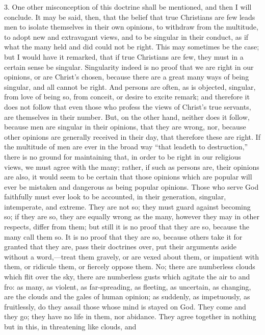 3. One other misconception of this doctrine shall be mentioned, and
then I will conclude. It may be said, then, that the belief that true
Christians are few leads men to isolate themselves in their own
opinions, to withdraw from the multitude, to adopt new and extravagant
views, and to be singular in their conduct, as if what the many held
and did could not be right. This may sometimes be the case; but I
would have it remarked, that if true Christians are few, they must in
a certain sense be singular. Singularity indeed is no proof that we
are right in our opinions, or are Christ's chosen, because there are a
great many ways of being singular, and all cannot be right. And
persons are often, as is objected, singular, from love of being so,
from conceit, or desire to excite remark; and therefore it does not
follow that even those who profess the views of Christ's true
servants, are themselves in their number. But, on the other hand,
neither does it follow, because men are singular in their opinions,
that they are wrong, nor, because other opinions are generally
received in their day, that therefore these are right. If the
multitude of men are ever in the broad way ``that leadeth to
destruction,'' there is no ground for maintaining that, in order
to be right in our religious views, we must agree with the many;
rather, if such as persons are, their opinions are also, it would seem
to be certain that those opinions which are popular will ever be
mistaken and dangerous as being popular opinions. Those who serve God
faithfully must ever look to be accounted, in their generation,
singular, intemperate, and extreme. They are not so; they must guard
against becoming so; if they are so, they are equally wrong as the
many, however they may in other respects, differ from them; but still
it is no proof that they are so, because the many call them so. It is
no proof that they are so, because others take it for granted that
they are, pass their doctrines over, put their arguments aside without
a word,—treat them gravely, or are vexed about them, or impatient
with them, or ridicule them, or fiercely oppose them. No; there are
numberless clouds which flit over the sky, there are numberless gusts
which agitate the air to and fro: as many, as violent, as
far-spreading, as fleeting, as uncertain, as changing, are the clouds
and the gales of human opinion; as suddenly, as impetuously, as
fruitlessly, do they assail those whose mind is stayed on God. They
come and they go; they have no life in them, nor abidance. They agree
together in nothing but in this, in threatening like clouds, and
